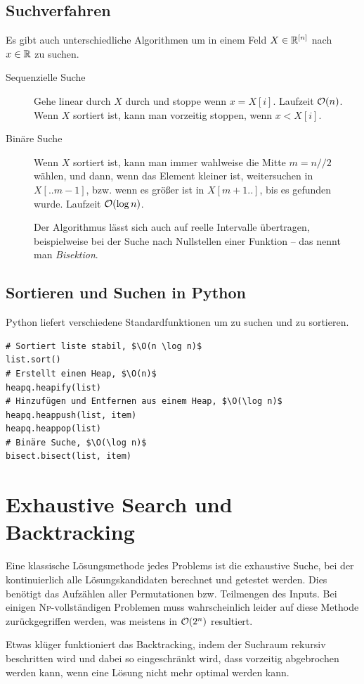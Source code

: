\subsection{Suchverfahren}
Es gibt auch unterschiedliche Algorithmen um in einem Feld \(X \in \mathbb R^{[n]}\) nach \(x \in \mathbb R\) zu suchen.
\begin{description}
    \item[Sequenzielle Suche] Gehe linear durch \(X\) durch und stoppe wenn \(x = X[i]\).
        Laufzeit \(\mathcal O(n)\).
        Wenn \(X\) sortiert ist, kann man vorzeitig stoppen, wenn \(x < X[i]\).

    \item[Binäre Suche] Wenn \(X\) sortiert ist, kann man immer wahlweise die Mitte \(m = n//2\) wählen, und dann, wenn das Element kleiner ist, weitersuchen in \(X[..m-1]\), bzw. wenn es größer ist in \(X[m+1..]\), bis es gefunden wurde.
        Laufzeit \(\mathcal O(\log n)\).

        Der Algorithmus lässt sich auch auf reelle Intervalle übertragen, beispielweise bei der Suche nach Nullstellen einer Funktion -- das nennt man \emph{Bisektion}.
\end{description}

\subsection{Sortieren und Suchen in Python}
Python liefert verschiedene Standardfunktionen um zu suchen und zu sortieren.
\begin{lstlisting}
# Sortiert liste stabil, $\O(n \log n)$
list.sort()
# Erstellt einen Heap, $\O(n)$
heapq.heapify(list)
# Hinzufügen und Entfernen aus einem Heap, $\O(\log n)$
heapq.heappush(list, item)
heapq.heappop(list)
# Binäre Suche, $\O(\log n)$
bisect.bisect(list, item)
\end{lstlisting}

\section{Exhaustive Search und Backtracking}
Eine klassische Lösungsmethode jedes Problems ist die exhaustive Suche, bei der kontinuierlich alle Lösungskandidaten berechnet und getestet werden.
Dies benötigt das Aufzählen aller Permutationen bzw. Teilmengen des Inputs.
Bei einigen \textsc{Np}-vollständigen Problemen muss wahrscheinlich leider auf diese Methode zurückgegriffen werden, was meistens in \(\mathcal O(2^n)\) resultiert.

Etwas klüger funktioniert das Backtracking, indem der Suchraum rekursiv beschritten wird und dabei so eingeschränkt wird, dass vorzeitig abgebrochen werden kann, wenn eine Lösung nicht mehr optimal werden kann.

